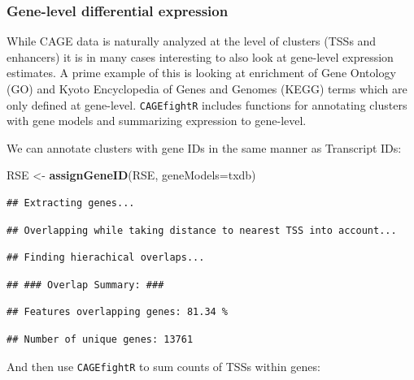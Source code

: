 \documentclass[9pt,a4paper,]{extarticle}
\newenvironment{Shaded}{\begin{snugshade}}{\end{snugshade}}
\newcommand{\KeywordTok}[1]{\textcolor[rgb]{0.13,0.29,0.53}{\textbf{{#1}}}}
\newcommand{\DataTypeTok}[1]{\textcolor[rgb]{0.13,0.29,0.53}{{#1}}}
\newcommand{\StringTok}[1]{\textcolor[rgb]{0.31,0.60,0.02}{{#1}}}
\newcommand{\NormalTok}[1]{{#1}}
\begin{document}
\subsubsection{Gene-level differential expression}\label{gene-level-differential-expression}

While CAGE data is naturally analyzed at the level of clusters (TSSs and enhancers) it is in many cases interesting to also look at gene-level expression estimates. A prime example of this is looking at enrichment of Gene Ontology (GO) and Kyoto Encyclopedia of Genes and Genomes (KEGG) terms \citep[Hancock2014; Gene2019;][]{Qi2016} which are only defined at gene-level. \texttt{CAGEfightR} includes functions for annotating clusters with gene models and summarizing expression to gene-level.

We can annotate clusters with gene IDs in the same manner as Transcript IDs:

\begin{Shaded}
\begin{Highlighting}[]
\NormalTok{RSE <-}\StringTok{ }\KeywordTok{assignGeneID}\NormalTok{(RSE, }\DataTypeTok{geneModels=}\NormalTok{txdb)}
\end{Highlighting}
\end{Shaded}

\begin{verbatim}
## Extracting genes...
\end{verbatim}

\begin{verbatim}
## Overlapping while taking distance to nearest TSS into account...
\end{verbatim}

\begin{verbatim}
## Finding hierachical overlaps...
\end{verbatim}

\begin{verbatim}
## ### Overlap Summary: ###
\end{verbatim}

\begin{verbatim}
## Features overlapping genes: 81.34 %
\end{verbatim}

\begin{verbatim}
## Number of unique genes: 13761
\end{verbatim}

And then use \texttt{CAGEfightR} to sum counts of TSSs within genes:

\begin{Shaded}
\end{Shaded}
\end{document}
